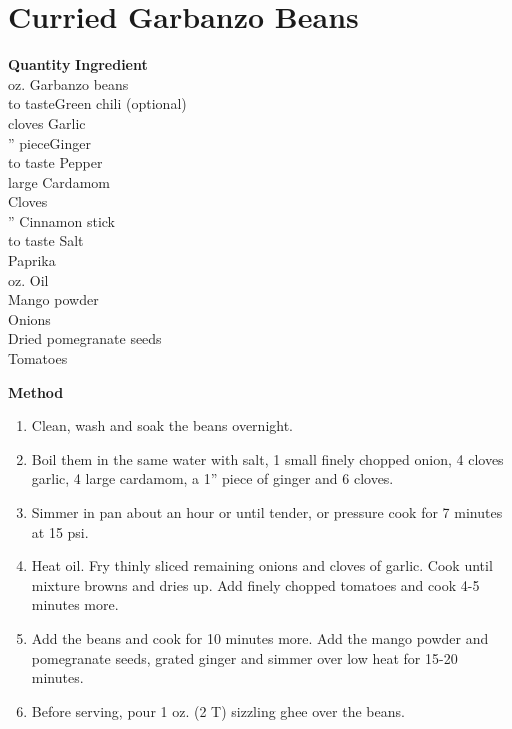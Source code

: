\section{Curried Garbanzo Beans}

\begin{tabbing}
\hspace{1.0cm}  \={\bf Quantity}   \hspace{3.0cm} \={\bf Ingredient}\\
 oz. \>Garbanzo beans                \\
\>to taste\>Green chili (optional)\\
 cloves \>Garlic\\
'' piece\>Ginger\\
\>to taste\>  Pepper\\
 large \>Cardamom\\
 \>Cloves\\
'' \>Cinnamon stick\\
\>to taste\>  Salt\\
\>\> Paprika    \\
 oz. \>Oil\\
\>\>  Mango powder\\
 \>Onions\\
\>\>  Dried pomegranate seeds\\
 \>Tomatoes\\
\end{tabbing}

{\bf Method}
\begin{enumerate}
\item Clean, wash and soak the beans overnight.
\item Boil them in the same water with salt, 1 small finely chopped onion, 4
cloves garlic, 4 large cardamom, a 1'' piece of ginger and 6 cloves.
\item Simmer in pan about an hour or until tender, or pressure cook for 7 minutes at
15 psi.
\item Heat oil. Fry thinly sliced remaining onions and cloves of garlic.
Cook until mixture browns and dries up. Add finely chopped tomatoes and cook
4-5 minutes more.
\item Add the beans and cook for 10 minutes more.  Add the mango powder and
pomegranate seeds, grated ginger and simmer over low heat for 15-20
minutes.
\item Before serving, pour 1 oz. (2 T) sizzling ghee over the beans.
\end{enumerate}



